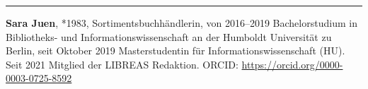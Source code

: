 \begin{center}\rule{0.5\linewidth}{0.5pt}\end{center}

\textbf{Sara Juen}, *1983, Sortimentsbuchhändlerin, von 2016--2019
Bachelorstudium in Bibliotheks- und Informationswissenschaft an der
Humboldt Universität zu Berlin, seit Oktober 2019 Masterstudentin für
Informationswissenschaft (HU). Seit 2021 Mitglied der LIBREAS Redaktion.
ORCID: \url{https://orcid.org/0000-0003-0725-8592}
